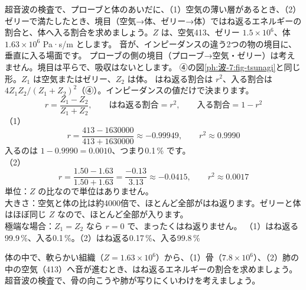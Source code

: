 \begin{kotoba}
\small
{}
\end{kotoba}

{}

\label{ph:波-7:ex1}
\begin{phreidai}
超音波の検査で、プローブと体のあいだに、（1）空気の薄い層があるとき、（2）ゼリーで満たしたとき、境目（空気→体、ゼリー→体）ではね返るエネルギーの割合と、体へ入る割合を求めましょう。$Z$ は、空気413、ゼリー $1.5\times10^6$、体 $1.63\times10^6$ Pa·s/m とします。
\phbamen
音が、インピーダンスの違う2つの物の境目に、垂直に入る場面です。
\phmushi
プローブの側の境目（プローブ→空気・ゼリー）は考えません。境目は平らで、吸収はないとします。
\phzu
④の図\ref{ph:波-7:fig-tsunagi}と同じ形。$Z_1$ は空気またはゼリー、$Z_2$ は体。
\phriyu
はね返る割合は $r^2$、入る割合は $4Z_1Z_2/(Z_1+Z_2)^2$（④）。インピーダンスの値だけで決まります。
\phtateru
\[r=\frac{Z_1-Z_2}{Z_1+Z_2},\qquad\text{はね返る割合}=r^2,\qquad\text{入る割合}=1-r^2\]
\phtoku
（1）\[r=\frac{413-\num{1630000}}{413+\num{1630000}}\approx-0.99949,\qquad r^2\approx0.9990\]
入るのは $1-0.9990=0.0010$、つまり0.1\,\% です。\\
（2）\[r=\frac{1.50-1.63}{1.50+1.63}=\frac{-0.13}{3.13}\approx-0.0415,\qquad r^2\approx0.0017\]
\phtashikame
単位：$Z$ の比なので単位はありません。\\
大きさ：空気と体の比は約4000倍で、ほとんど全部がはね返ります。ゼリーと体はほぼ同じ $Z$ なので、ほとんど全部が入ります。\\
極端な場合：$Z_1=Z_2$ なら $r=0$ で、まったくはね返りません。
\kotae （1）はね返る99.9\,\%、入る0.1\,\%。（2）はね返る0.17\,\%、入る99.8\,\%
\end{phreidai}
\begin{jibun}
体の中で、軟らかい組織（$Z=1.63\times10^6$）から、（1）骨（$7.8\times10^6$）、（2）肺の中の空気（413）へ音が進むとき、はね返るエネルギーの割合を求めましょう。超音波の検査で、骨の向こうや肺が写りにくいわけを考えましょう。
\end{jibun}

